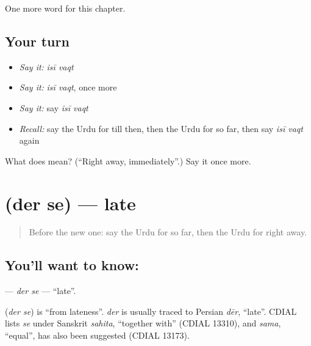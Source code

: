 \begin{grammarlens}[title={What you've built}]
One more word for this chapter.
\end{grammarlens}

\subsection*{Your turn}
\begin{itemize}
\raggedright
  \item \emph{Say it:} \emph{isī vaqt}
  \item \emph{Say it:} \emph{isī vaqt}, once more
  \item \emph{Say it:} say \emph{isī vaqt}
  \item \emph{Recall:} say the Urdu for till then, then the Urdu for so far, then say \emph{isī vaqt} again
\end{itemize}

\begin{tcolorbox}[breakable,colback=teal!4,colframe=teal!35!black,title={Before you move on}]
What does   mean? (\textquotedblleft{}Right away, immediately\textquotedblright{}.) Say it once more.
\end{tcolorbox}
\section[\texorpdfstring{\ur{دیر} \ur{سے} (der se)}{دیر سے (der se)}]{  (der se) — late}

\label{lesson:UR-C189-der-se}



\begin{quote}
Before the new one: say the Urdu for so far, then the Urdu for right away.
\end{quote}

\subsection*{You'll want to know:  }
\textbf{ } — \emph{der se} — \textquotedblleft{}late\textquotedblright{}.

\begin{cousinweb}
\textbf{ } (\emph{der se}) is \textquotedblleft{}from lateness\textquotedblright{}. \emph{der} is usually traced to Persian \emph{dēr}, \textquotedblleft{}late\textquotedblright{}. CDIAL lists \emph{se} under Sanskrit \emph{sahita}, \textquotedblleft{}together with\textquotedblright{} (CDIAL 13310), and \emph{sama}, \textquotedblleft{}equal\textquotedblright{}, has also been suggested (CDIAL 13173).
\end{cousinweb}

